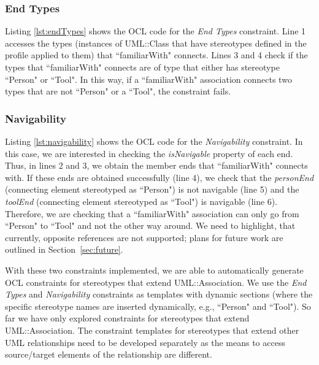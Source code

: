 \subsubsection{End Types}
Listing \ref{lst:endTypes} shows the OCL code for the \emph{End Types} constraint. 
Line 1 accesses the types (instances of UML::Class that have stereotypes defined in the profile applied to them) that ``familiarWith" connects. 
Lines 3 and 4 check if the types that ``familiarWith" connects are of type that either has stereotype ``Person" or ``Tool". 
In this way, if a ``familiarWith" association connects two types that are not ``Person" or a ``Tool", the constraint fails.



\subsubsection{Navigability}
Listing \ref{lst:navigability} shows the OCL code for the \emph{Navigability} constraint. 
In this case, we are interested in checking the \emph{isNavigable} property of each end. 
Thus, in lines 2 and 3, we obtain the member ends that ``familiarWith" connects with. 
If these ends are obtained successfully (line 4), we check that the \emph{personEnd} (connecting element stereotyped as ``Person") is not navigable (line 5) and the \emph{toolEnd} (connecting element stereotyped as ``Tool") is navigable (line 6). 
Therefore, we are checking that a ``familiarWith" association can only go from ``Person" to ``Tool" and not the other way around. 
We need to highlight, that currently, opposite references are not supported; plans for future work are outlined in Section~\ref{sec:future}.

\begin{figure}[h]
	
\end{figure}

With these two constraints implemented, we are able to automatically generate OCL constraints for stereotypes that extend UML::Association. 
We use the \emph{End Types} and \emph{Navigability} constraints as templates with dynamic sections (where the specific stereotype names are inserted dynamically, e.g., ``Person" and ``Tool"). 
So far we have only explored constraints for stereotypes that extend UML::Association. 
The constraint templates for stereotypes that extend other UML relationships need to be developed separately as the means to access source/target elements of the relationship are different.

